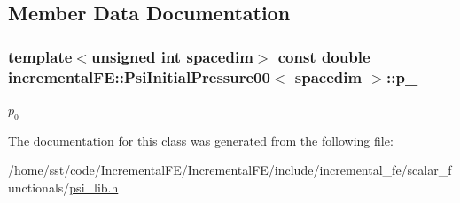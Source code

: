 \subsection{Member Data Documentation}
\subsubsection[{\texorpdfstring{p\+\_\+0}{p_0}}]{\setlength{\rightskip}{0pt plus 5cm}template$<$unsigned int spacedim$>$ const double {\bf incremental\+F\+E\+::\+Psi\+Initial\+Pressure00}$<$ spacedim $>$\+::p\+\_\hspace{0.3cm}{\ttfamily [private]}}\hypertarget{classincremental_f_e_1_1_psi_initial_pressure00_a8acf3825dbfea2fe0e0ebc5711b93fca}{}\label{classincremental_f_e_1_1_psi_initial_pressure00_a8acf3825dbfea2fe0e0ebc5711b93fca}
$p_0$ 

The documentation for this class was generated from the following file\+:\begin{DoxyCompactItemize}
\item 
/home/sst/code/\+Incremental\+F\+E/\+Incremental\+F\+E/include/incremental\+\_\+fe/scalar\+\_\+functionals/\hyperlink{psi__lib_8h}{psi\+\_\+lib.\+h}\end{DoxyCompactItemize}
